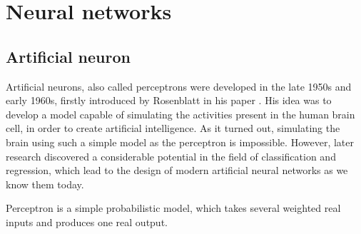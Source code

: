 \chapter{Neural networks}
\label{chapter-ml}

\section{Artificial neuron}

Artificial neurons, also called perceptrons were developed in the late 1950s and early 1960s, firstly introduced by Rosenblatt in his paper \cite{perceptron}. His idea was to develop a model capable of simulating the activities present in the human brain cell, in order to create artificial intelligence. As it turned out, simulating the brain using such a simple model as the perceptron is impossible. However, later research discovered a considerable potential in the field of classification and regression, which lead to the design of modern artificial neural networks as we know them today.

Perceptron\cite{nn_book} is a simple probabilistic model, which takes several weighted real inputs and produces one real output.

\vspace{3mm}

